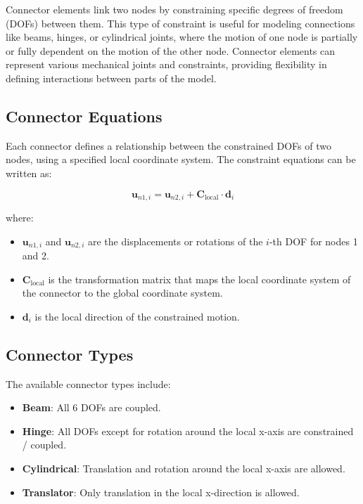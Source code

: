 Connector elements link two nodes by constraining specific degrees of freedom (DOFs) between them. This type of constraint is useful for modeling connections like beams, hinges, or cylindrical joints, where the motion of one node is partially or fully dependent on the motion of the other node. Connector elements can represent various mechanical joints and constraints, providing flexibility in defining interactions between parts of the model.

\subsection{Connector Equations}

Each connector defines a relationship between the constrained DOFs of two nodes, using a specified local coordinate system. The constraint equations can be written as:

\[
\mathbf{u}_{n1,i} = \mathbf{u}_{n2,i} + \mathbf{C}_{\text{local}} \cdot \mathbf{d}_i
\]

where:
\begin{itemize}
    \item \( \mathbf{u}_{n1,i} \) and \( \mathbf{u}_{n2,i} \) are the displacements or rotations of the \( i \)-th DOF for nodes 1 and 2.
    \item \( \mathbf{C}_{\text{local}} \) is the transformation matrix that maps the local coordinate system of the connector to the global coordinate system.
    \item \( \mathbf{d}_i \) is the local direction of the constrained motion.
\end{itemize}

\subsection{Connector Types}

The available connector types include:
\begin{itemize}
\item \textbf{Beam}: All 6 DOFs are coupled.
\item \textbf{Hinge}: All DOFs except for rotation around the local x-axis are constrained / coupled.
 \item \textbf{Cylindrical}: Translation and rotation around the local x-axis are allowed.
 \item \textbf{Translator}: Only translation in the local x-direction is allowed.
 \end{itemize}

